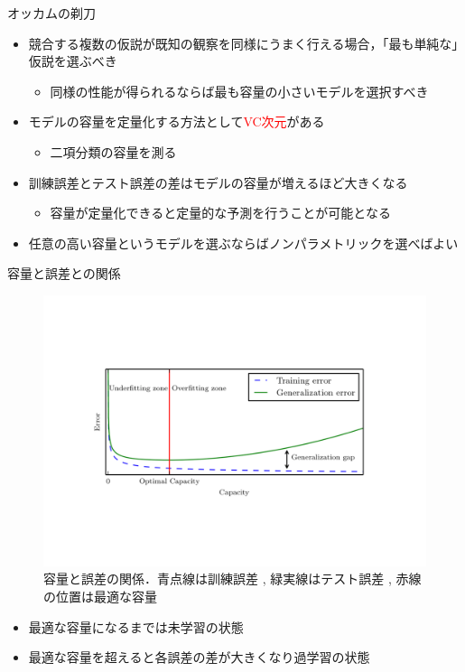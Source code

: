 \documentclass[dvipdfmx, 10pt]{beamer}
\begin{document}

\begin{frame}{オッカムの剃刀}
  \begin{itemize}
    \item 競合する複数の仮説が既知の観察を同様にうまく行える場合，「最も単純な」仮説を選ぶべき
    \begin{itemize}
      \item 同様の性能が得られるならば最も容量の小さいモデルを選択すべき
    \end{itemize}
    \item モデルの容量を定量化する方法として\textcolor{red}{VC次元}がある
    \begin{itemize}
      \item 二項分類の容量を測る
    \end{itemize}
    \item 訓練誤差とテスト誤差の差はモデルの容量が増えるほど大きくなる
    \begin{itemize}
      \item 容量が定量化できると定量的な予測を行うことが可能となる
    \end{itemize}
    \item 任意の高い容量というモデルを選ぶならばノンパラメトリックを選べばよい
  \end{itemize}
\end{frame}


\begin{frame}{容量と誤差との関係}
  \begin{figure}[htbp]
     \includegraphics[keepaspectratio, scale=0.4, angle=-90]{./images/capacity.pdf}
     \caption{容量と誤差の関係．青点線は訓練誤差 , 緑実線はテスト誤差 , 赤線の位置は最適な容量}
  \end{figure}
  \begin{itemize}
    \item 最適な容量になるまでは未学習の状態
    \item 最適な容量を超えると各誤差の差が大きくなり過学習の状態
  \end{itemize}
\end{frame}
\end{document}
